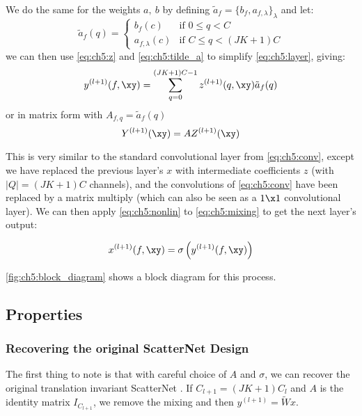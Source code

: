 We do the same for the weights $a,\ b$ by defining $\tilde{a}_f = \{b_f, a_{f,
\lambda} \}_{\lambda}$ and let:
\begin{equation}
  \tilde{a}_f(q) =  \left\{
    \begin{array}{ll}
      b_f(c) & \mbox{if } 0 \leq q < C \\
      a_{f, \lambda}(c) & \mbox{if }	C \leq q < (JK+1)C
    \end{array}
    \right. \label{eq:ch5:tilde_a}
\end{equation}
%
we can then use \eqref{eq:ch5:z} and \eqref{eq:ch5:tilde_a} to simplify 
\eqref{eq:ch5:layer}, giving:
\begin{equation}
  y^{(l+1)}(f, \xy)  =  \sum_{q=0}^{(JK + 1)C - 1} z^{(l+1)}(q, \xy) \tilde{a}_f(q) \label{eq:ch5:mixing}
\end{equation}
or in matrix form with $A_{f,q} = \tilde{a}_f(q)$
%
\begin{equation}
  Y^{(l+1)}(\xy)  =  A Z^{(l+1)}(\xy) \label{eq:ch5:matrix}
\end{equation}

This is very similar to the standard convolutional layer from
\eqref{eq:ch5:conv}, except we have replaced the previous layer's $x$ with
intermediate coefficients $z$ (with $|Q| = (JK+1)C$ channels), and the
convolutions of \eqref{eq:ch5:conv} have been replaced by a matrix multiply
(which can also be seen as a $1\x 1$ convolutional layer). We can then apply
\eqref{eq:ch5:nonlin} to \eqref{eq:ch5:mixing} to get the next layer's output:

\begin{equation}
  x^{(l+1)}(f, \xy) = \sigma\left( y^{(l+1)}(f, \xy) \right)
  \label{eq:ch5:xnext}
\end{equation}

\autoref{fig:ch5:block_diagram} shows a block diagram for this process. 



\subsection{Properties}
\subsubsection{Recovering the original ScatterNet Design}
The first thing to note is that with careful choice of $A$ and $\sigma$, we can
recover the original translation invariant ScatterNet
\cite{bruna_invariant_2013, oyallon_scaling_2017}. If $C_{l+1} = (JK+1)C_l$ 
and $A$ is the identity matrix $I_{C_{l+1}}$, we remove the mixing and then $y^{(l+1)} = \tilde{W}x$.

